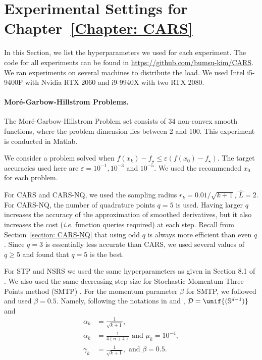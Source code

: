 \section{Experimental Settings for Chapter~\ref{Chapter: CARS}}\label{appendix: Experiments}
In this Section, we list the hyperparameters we used for each experiment. The code for all experiments can be found in \url{https://github.com/bumsu-kim/CARS}. We ran experiments on several machines to distribute the load. We used Intel i5-9400F with Nvidia RTX 2060 and i9-9940X with two RTX 2080.

\paragraph{Mor\'{e}-Garbow-Hillstrom Problems.}
The Mor\'{e}-Garbow-Hillstrom Problem set consists of 34 non-convex smooth functions, where the problem dimension lies between 2 and 100. This experiment is conducted in Matlab.

We consider a problem solved when $f(x_k) - f_{\star} \leq \varepsilon(f(x_0) - f_\star)$. The target accuracies used here are $\varepsilon = 10^{-1}, 10^{-3}$ and $10^{-5}$.
We used the recommended $x_0$ for each problem.

For CARS and CARS-NQ, we used the sampling radius $r_k = 0.01/\sqrt{k+1}$, $\hat{L} = 2$. For CARS-NQ, the number of quadrature points $q=5$ is used. Having larger $q$ increases the accuracy of the approximation of smoothed derivatives, but it also increases the cost ({\em i.e.} function queries required) at each step. Recall from Section~\ref{section: CARS-NQ} that using odd $q$ is always more efficient than even $q$. Since $q=3$ is essentially less accurate than CARS, we used several values of $q\geq 5$ and found that $q=5$ is the best.

For STP \cite{bergou2020stochastic} and NSRS \cite{nesterov2017random} we used the same hyperparameters as given in Section 8.1 of \cite{bergou2020stochastic}. We also used the same decreasing step-size for Stochastic Momentum Three Points method (SMTP) \cite{gorbunov2019stochastic}. For the momentum parameter $\beta$ for SMTP, we followed \cite{gorbunov2019stochastic} and used $\beta = 0.5$.
Namely, following the notations in \cite{bergou2020stochastic} and \cite{gorbunov2019stochastic},
$\mathcal{D} = \unif {(\mathbb{S}^{d-1})}$ and 
\begin{align}
    \alpha_k & = \frac{1}{\sqrt{k+1}}, \tag{STP}\\
    \alpha_k & = \frac{1}{4(n+4)} \textrm{ and } \mu_k = 10^{-4}, \tag{NSRS}\\
    \gamma_k & = \frac{1}{\sqrt{k+1}}, \textrm{ and } \beta = 0.5. \tag{SMTP}
\end{align}

